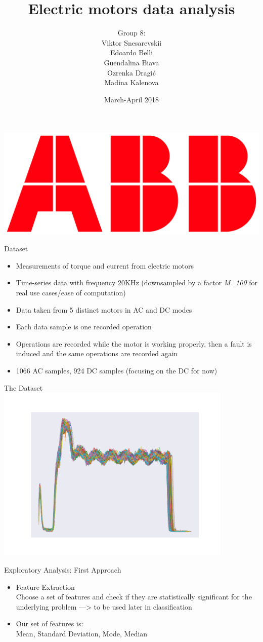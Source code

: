 \documentclass[9pt]{beamer}
\title[Electric motors data analysis]{\huge Electric motors data analysis}
\author[Snesarevskii, Belli, Biava, Dragi\'c, Kalenova] {{\Large Group 8:\\}Viktor Snesarevskii\\Edoardo Belli\\Guendalina Biava\\Ozrenka Dragi\'c\\Madina Kalenova}
\date{March-April 2018}
\begin{document}
	\begin{frame}
	\titlepage
	\vfill
	\begin{flushright}
		\includegraphics[height=.7cm]{abb.png}
	\end{flushright}
\end{frame}

\begin{frame}{Dataset}
\begin{itemize} %
\item Measurements of torque and current from electric motors
\item Time-series data with frequency 20KHz (downsampled by a factor \textit{M=100} for real use cases/ease of computation)
\item Data taken from 5 distinct motors in AC and DC modes
\item Each data sample is one recorded operation
\item Operations are recorded while the motor is working properly, then a fault is induced and the same operations are recorded again 
\item 1066 AC samples, 924 DC samples (focusing on the DC for now)
\end{itemize}
\end{frame}

\begin{frame}{The Dataset}
\centering
\includegraphics[width=0.85\textwidth]{multiplot.pdf}
\end{frame}

\begin{frame}{Exploratory Analysis: First Approach}
\begin{itemize} %
\item {\large Feature Extraction}\\
Choose a set of features and check if they are statistically significant for the underlying problem ---> to be used later in classification
\item {\large Our set of features is:}\\
Mean, Standard Deviation, Mode, Median
\end{itemize}
\end{frame}
\end{document}
